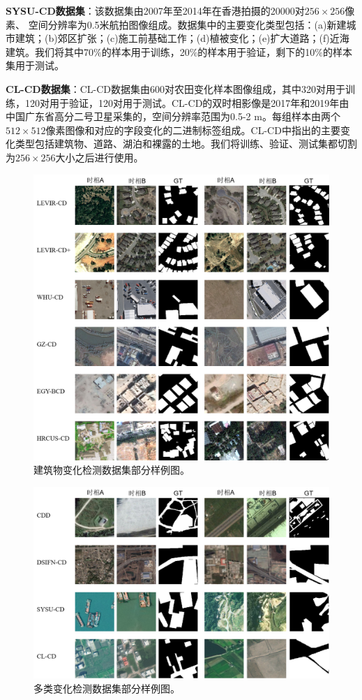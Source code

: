 \documentclass[lang=chs, degree=master, blindreview=false, adobe=false]{yanputhesis}
\begin{document}
\textbf{SYSU-CD数据集}：该数据集由2007年至2014年在香港拍摄的20000对$256\times256$像素、 空间分辨率为0.5米航拍图像组成。数据集中的主要变化类型包括：(a)新建城市建筑；(b)郊区扩张；(c)施工前基础工作；(d)植被变化；(e)扩大道路；(f)近海建筑。我们将其中70$\%$的样本用于训练，20$\%$的样本用于验证，剩下的10$\%$的样本集用于测试。

\textbf{CL-CD数据集}：CL-CD数据集由600对农田变化样本图像组成，其中320对用于训练，120对用于验证，120对用于测试。CL-CD的双时相影像是2017年和2019年由中国广东省高分二号卫星采集的，空间分辨率范围为0.5-2 m。每组样本由两个$512 \times 512$像素图像和对应的字段变化的二进制标签组成。CL-CD中指出的主要变化类型包括建筑物、道路、湖泊和裸露的土地。我们将训练、验证、测试集都切割为$256\times256$大小之后进行使用。
\begin{figure}[htb]
  \centering
  \includegraphics[scale=0.65]{images/building_sample.png}
  \caption{
    建筑物变化检测数据集部分样例图。
  }
  \label{fig:building_sample}
\end{figure}

\begin{figure}[htb]
  \centering
  \includegraphics[scale=0.65]{images/mutil_sample.png}
  \caption{
    多类变化检测数据集部分样例图。
  }
  \label{fig:mutil_sample}
\end{figure}
\end{document}
